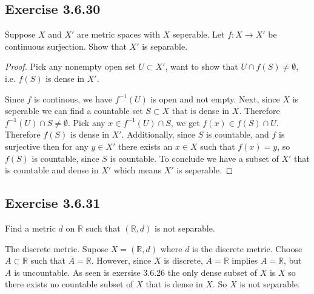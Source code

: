\documentclass{tufte-book}
\theoremstyle{mytheoremstyle}
\theoremstyle{mylemstyle}
\theoremstyle{mydefstyle}
\begin{document}
\subsection{Exercise 3.6.30}
Suppose $X$ and $X'$ are metric spaces with $X$ seperable.  Let $f:X \to X'$ be continuous surjection.  Show that $X'$ is separable.
\begin{proof}
Pick any nonempty open set $U \subset X'$, want to show that $U \cap f(S) \neq \emptyset$, i.e. $f(S)$ is dense in $X'$.

Since $f$ is continous, we have $f^{-1}(U)$ is open and not empty.  Next, since $X$ is seperable we can find a countable set $S \subset X$ that is dense in $X$. Therefore $f^{-1}(U) \cap S \neq \emptyset$.  Pick any $x \in f^{-1}(U) \cap S$, we get $f(x) \in f(S) \cap U$.  Therefore $f(S)$ is dense in $X'$.  Additionally, since $S$ is countable, and $f$ is surjective then for any $y \in X'$ there exists an $x \in X$ such that $f(x) = y$, so $f(S)$ is countable, since $S$ is countable.  To conclude we have a subset of $X'$ that is countable and dense in $X'$ which means $X'$ is seperable. 
\end{proof}

\subsection{Exercise 3.6.31}
Find a metric $d$ on $\mathbb{R}$ such that $(\mathbb{R}, d)$ is not separable.

The discrete metric.  Supose $X = (\mathbb{R}, d)$ where $d$ is the discrete metric.  Choose $A \subset \mathbb{R}$ such that $\overline{A}= \mathbb{R}$.  However, since $X$ is discrete,  $\overline{A}= \mathbb{R}$ implies $A = \mathbb{R}$, but $A$ is uncountable.  As seen is exersise 3.6.26 the only dense subset of $X$ is $X$ so there exists no countable subset of $X$ that is dense in $X$.  So $X$ is not separable.
\end{document}
